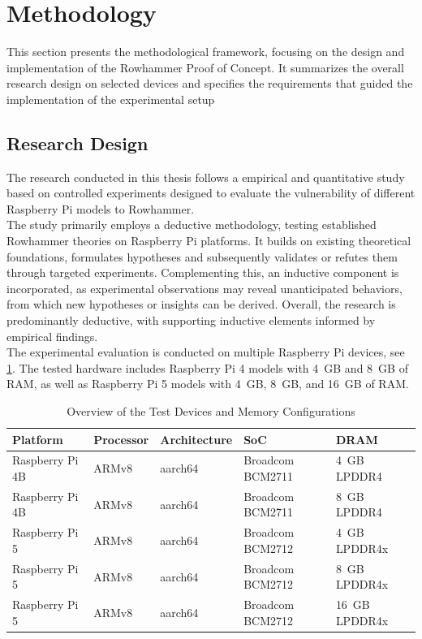 \section{Methodology} \label{sec:methodology}
  This section presents the methodological framework, focusing on the design 
  and implementation of the Rowhammer Proof of Concept. It summarizes the 
  overall research design on selected devices and specifies the requirements 
  that guided the implementation of the experimental setup

  \subsection{Research Design} \label{subsec:research-design}
    The research conducted in this thesis follows a empirical and quantitative study based 
    on controlled experiments designed to evaluate the vulnerability of different Raspberry
    Pi models to Rowhammer.
    \\
    The study primarily employs a deductive methodology, testing established 
    Rowhammer theories on Raspberry Pi platforms. It builds on existing 
    theoretical foundations, formulates hypotheses and subsequently validates or refutes them 
    through targeted experiments. Complementing this, 
    an inductive component is incorporated, as experimental observations may 
    reveal unanticipated behaviors, from which new hypotheses or insights can
    be derived. Overall, the research is predominantly deductive, with 
    supporting inductive elements informed by empirical findings.
    \\
    The experimental evaluation is conducted on multiple Raspberry Pi devices, see \cref{tab:overview-of-test-devices}. 
    The tested hardware includes Raspberry Pi 4 models with 4~GB and 8~GB of 
    RAM, as well as Raspberry Pi 5 models with 4~GB, 8~GB, and 16~GB of RAM.
    
    \begin{table}[h!]
      \centering
      \caption{Overview of the Test Devices and Memory Configurations}
      \label{tab:overview-of-test-devices}
      \begin{tabular}{|l|l|l|l|l|}
        \hline
        \textbf{Platform} & \textbf{Processor} & \textbf{Architecture} & \textbf{SoC} & \textbf{DRAM} \\ \hline
        Raspberry Pi 4B & ARMv8 & aarch64 & Broadcom BCM2711 & 4~GB LPDDR4 \\ \hline
        Raspberry Pi 4B & ARMv8 & aarch64 & Broadcom BCM2711 & 8~GB LPDDR4 \\ \hline
        Raspberry Pi 5 & ARMv8 & aarch64 & Broadcom BCM2712 & 4~GB LPDDR4x \\ \hline
        Raspberry Pi 5 & ARMv8 & aarch64 & Broadcom BCM2712 & 8~GB LPDDR4x \\ \hline
        Raspberry Pi 5 & ARMv8 & aarch64 & Broadcom BCM2712 & 16~GB LPDDR4x \\ \hline
      \end{tabular}
    \end{table}

